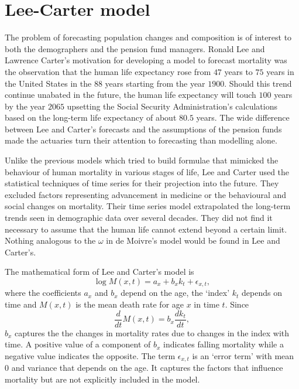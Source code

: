 \documentclass{article}
\numberwithin{equation}{section}
\begin{document}
\section{Lee-Carter model}\label{s6}
The problem of forecasting population changes and composition is of interest
to both the demographers and the pension fund managers. Ronald Lee and 
Lawrence Carter's motivation for developing a model to forecast mortality was
the observation that the human life expectancy rose from $47$ years to $75$ 
years in the United States in the $88$ years starting from the year $1900$.
Should this trend continue unabated in the future, the human life expectancy
will touch $100$ years by the year $2065$ upsetting the Social Security 
Administration's calculations based on the long-term life expectancy of about
$80.5$ years. The wide difference between Lee and Carter's 
\cite{lee1992modeling} forecasts and the assumptions of the pension funds 
made the actuaries turn their attention to forecasting than modelling alone.

Unlike the previous models which tried to build formulae that mimicked the
behaviour of human mortality in various stages of life, Lee and Carter used
the statistical techniques of time series for their projection into the future.
They excluded factors representing advancement in medicine or the behavioural
and social changes on mortality. Their time series model extrapolated the 
long-term trends seen in demographic data over several decades. They did not
find it necessary to assume that the human life cannot extend beyond a certain
limit. Nothing analogous to the $\omega$ in de Moivre's model would be found
in Lee and Carter's.

The mathematical form of Lee and Carter's model is
\begin{equation}\label{s6e1}
\log{M}(x, t) = {a}_x + {b}_x{k}_t + \epsilon_{x, t},
\end{equation}
where the coefficients ${a}_x$ and ${b}_x$ depend on the age, the
`index' ${k}_t$ depends on time and ${M}(x, t)$ is the mean death
rate for age $x$ in time $t$. Since
\[
\frac{d}{dt}{M}(x, t) = {b}_x\frac{dk_t}{dt},
\]
${b}_x$ captures the the changes in mortality rates due to changes in
the index with time. A positive value of a component of ${b}_x$ indicates
falling mortality while a negative value indicates the opposite. The term
$\epsilon_{x, t}$ is an `error term' with mean $0$ and variance that depends
on the age. It captures the factors that influence mortality but are not
explicitly included in the model.
\end{document}
